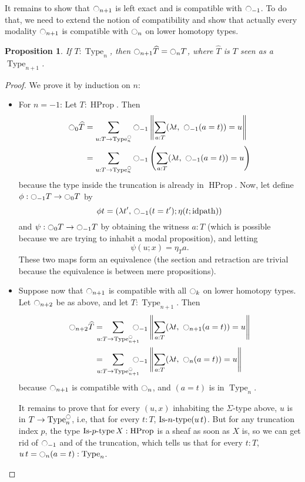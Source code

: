 \documentclass[conference]{IEEEtran}
\newtheorem{prop}[thm]{Proposition}
\newcommand{\ie}{i.e,\xspace}
\DeclareMathOperator{\Type}{Type}
\DeclareMathOperator{\HProp}{HProp}
\def\mymathhyphen{{\hbox{-}}}
\newcommand{\IsType}[1]
{\mathop{\mathrm{Is\mymathhyphen}#1\mathrm{\mymathhyphen type}} }
\newcommand{\modal}{\ensuremath{\ocircle}}
\begin{document}
It remains to show that $\modal_{n+1}$ is left exact and is compatible
with $\modal_{-1}$. To do that, we need to extend the notion of
compatibility and show that actually every modality $\modal_{n+1}$ is
compatible with $\modal_n$ on lower homotopy types.
\begin{prop}
  If $T:\Type_n$, then $\modal_{n+1} \widehat T = \modal_n T$, where $\widehat T$ is $T$ seen as a
  $\Type_{n+1}$.
\end{prop}
\begin{proof}
  We prove it by induction on $n$:
  \begin{itemize}
  \item For $n=-1$: Let $T:\HProp$. Then
    \begin{align*}
      \modal_{0} \widehat T &= \sum_{u:T \to \Type_n^\modal} \modal_{-1}\left\| \sum_{a:T} 
      (\lambda t,~\modal_{-1} (a=t)) = u\right\| \\
      &= \sum_{u:T \to \Type_n^\modal} \modal_{-1}\left( \sum_{a:T} 
      (\lambda t,~\modal_{-1} (a=t)) = u\right)
    \end{align*}
    because the type inside the truncation is already in $\HProp$.
    Now, let define $\phi : \modal_{-1} T \to \modal_0T$ by
    $$\phi t = (\lambda t',\, \modal_{-1}(t=t') ; \eta
    (t;\mathrm{idpath}))$$
    and $\psi : \modal_0T\to \modal_{-1} T$ by obtaining the
    witness $a:T$ (which is possible because we are trying to inhabit
    a modal proposition), and letting
    $$\psi (u;x) = \eta_T a.$$
    These two maps form an equivalence (the section and retraction are
    trivial because the equivalence is between mere propositions).
  \item Suppose now that $\modal_{n+1}$ is compatible with all $\modal_k$ on
    lower homotopy types. Let $\modal_{n+2}$ be as above, and let
    $T:\Type_{n+1}$. Then
    \begin{align*}
      \modal_{n+2} \widehat  T &= \hspace{-1em} \sum_{u:T \to \Type_{n+1}^\modal}
                       \hspace{-1em} \modal_{-1}\left\| \sum_{a:T} 
            (\lambda t,~\modal_{n+1} (a=t)) = u\right\| \\
                     &= \hspace{-1em} \sum_{u:T \to
                       \Type_{n+1}^\modal} 
\hspace{-1em} \modal_{-1}\left\| \sum_{a:T} 
            (\lambda t,~\modal_{n} (a=t)) = u\right\|
    \end{align*}
    because $\modal_{n+1}$ is compatible with $\modal_{n}$, and
    $(a=t)$ is in $\Type_n$.

    It remains to prove that for every $(u,x)$ inhabiting the
    $\Sigma$-type above, $u$ is in $T\to\Type_n^\modal$, \ie that for
    every $t:T$, $\IsType n (u\, t)$.  But for any truncation index
    $p$,
    the type $\IsType p X:\HProp$ is a sheaf as soon as $X$ is, so we can get rid
    of $\modal_{-1}$ and of the truncation, which tells us that for
    every 
    $t:T$, $u\, t = \modal_n(a=t) : \Type_n$.
  \end{itemize}
\end{proof}
\end{document}
